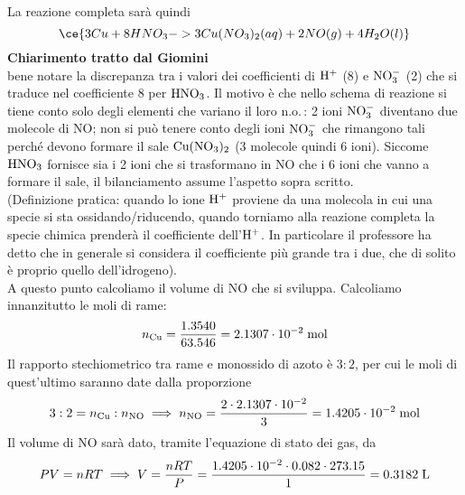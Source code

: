 \begin{soluzione}
\begin{equation*}
    \end{equation*}
    La reazione completa sarà quindi
    \begin{equation*}
        \ce{3Cu + 8HNO_3 -> 3Cu(NO_3)_2(aq) + 2NO(g) + 4H_2O(l)}
    \end{equation*}
    \textbf{Chiarimento tratto dal Giomini}\\
    \E bene notare la discrepanza tra i valori dei coefficienti di $\rm H^+$ (8) e $\rm NO_3^-$ (2) che si traduce nel coefficiente 8 per $\rm HNO_3$. Il motivo è che nello schema di reazione si tiene conto solo degli elementi che variano il loro n.o.\,: 2 ioni $\rm NO_3^-$ diventano due molecole di NO; non si può tenere conto degli ioni $\rm NO_3^-$ che rimangono tali perché devono formare il sale $\rm Cu(NO_3)_2$ (3 molecole quindi 6 ioni). Siccome $\rm HNO_3$ fornisce sia i 2 ioni che si trasformano in NO che i 6 ioni che vanno a formare il sale, il bilanciamento assume l'aspetto sopra scritto.\\
    (Definizione pratica: quando lo ione $\rm H^+$ proviene da una molecola in cui una specie si sta ossidando/riducendo, quando torniamo alla reazione completa la specie chimica prenderà il coefficiente dell'$\rm H^+$. In particolare il professore ha detto che in generale si considera il coefficiente più grande tra i due, che di solito è proprio quello dell'idrogeno).\\[0.2cm]
    A questo punto calcoliamo il volume di NO che si sviluppa. Calcoliamo innanzitutto le moli di rame:
    \begin{equation*}
        n_{\rm Cu}
        =\frac{1.3540}{63.546}
        =2.1307 \cdot 10^{-2} \; \rm mol
    \end{equation*}
    Il rapporto stechiometrico tra rame e monossido di azoto è $3:2$, per cui le moli di quest'ultimo saranno date dalla proporzione
    \begin{equation*}
        3:2=n_{\rm Cu}:n_{\rm NO}
        \implies
        n_{\rm NO}
        =\frac{2 \cdot 2.1307 \cdot 10^{-2}}{3}
        =1.4205 \cdot 10^{-2} \; \rm mol
    \end{equation*}
    Il volume di NO sarà dato, tramite l'equazione di stato dei gas, da
    \begin{equation*}
        PV=nRT
        \implies
        V=\frac{nRT}{P}
        =\frac{1.4205 \cdot 10^{-2} \cdot 0.082 \cdot 273.15}{1}
        =0.3182 \; \rm L
    \end{equation*}
\end{soluzione}

